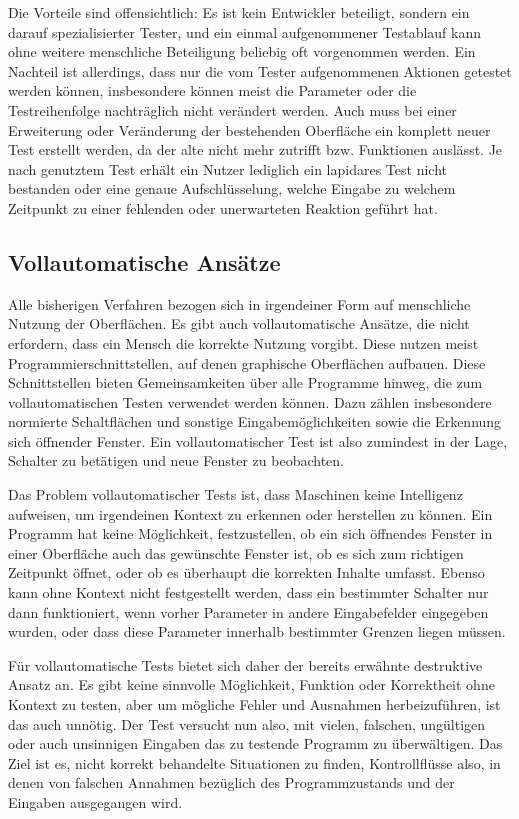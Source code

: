 Die Vorteile sind offensichtlich: Es ist kein Entwickler beteiligt, sondern ein
darauf spezialisierter Tester, und ein einmal aufgenommener Testablauf kann ohne weitere
menschliche Beteiligung beliebig oft vorgenommen werden. Ein Nachteil ist allerdings, dass
nur die vom Tester aufgenommenen Aktionen getestet werden können, insbesondere können
meist die Parameter oder die Testreihenfolge nachträglich nicht verändert werden. Auch
muss bei einer Erweiterung oder Veränderung der bestehenden Oberfläche ein komplett neuer Test
erstellt werden, da der alte nicht mehr zutrifft bzw. Funktionen auslässt. Je nach genutztem
Test erhält ein Nutzer lediglich ein lapidares \glqq{}Test nicht bestanden\grqq{} oder
eine genaue Aufschlüsselung, welche Eingabe zu welchem Zeitpunkt zu einer fehlenden 
oder unerwarteten Reaktion geführt hat.

\subsection{Vollautomatische Ansätze}

Alle bisherigen Verfahren bezogen sich in irgendeiner Form auf menschliche Nutzung der
Oberflächen. Es gibt auch vollautomatische Ansätze, die nicht erfordern, dass ein Mensch
die korrekte Nutzung vorgibt. Diese nutzen meist Programmierschnittstellen,
auf denen graphische Oberflächen aufbauen. Diese Schnittstellen bieten Gemeinsamkeiten
über alle Programme hinweg, die zum vollautomatischen Testen verwendet werden können.
Dazu zählen insbesondere normierte Schaltflächen und sonstige Eingabemöglichkeiten
sowie die Erkennung sich öffnender Fenster. Ein vollautomatischer Test ist also zumindest
in der Lage, Schalter zu betätigen und neue Fenster zu beobachten.

Das Problem vollautomatischer Tests ist, dass Maschinen keine Intelligenz aufweisen,
um irgendeinen Kontext zu erkennen oder herstellen zu können. Ein Programm hat
keine Möglichkeit, festzustellen, ob ein sich öffnendes Fenster in einer Oberfläche
auch das gewünschte Fenster ist, ob es sich zum richtigen Zeitpunkt öffnet, oder
ob es überhaupt die korrekten Inhalte umfasst. Ebenso kann ohne Kontext nicht festgestellt
werden, dass ein bestimmter Schalter nur dann funktioniert, wenn vorher Parameter
in andere Eingabefelder eingegeben wurden, oder dass diese Parameter innerhalb bestimmter
Grenzen liegen müssen.

Für vollautomatische Tests bietet sich daher der bereits erwähnte destruktive Ansatz an.
Es gibt keine sinnvolle Möglichkeit, Funktion oder Korrektheit ohne Kontext zu testen,
aber um mögliche Fehler und Ausnahmen herbeizuführen, ist das auch unnötig.
Der Test versucht nun also, mit vielen, falschen, ungültigen oder auch unsinnigen
Eingaben das zu testende Programm zu überwältigen. Das Ziel ist es, nicht korrekt
behandelte Situationen zu finden, Kontrollflüsse also, in denen von falschen
Annahmen bezüglich des Programmzustands und der Eingaben ausgegangen wird.

